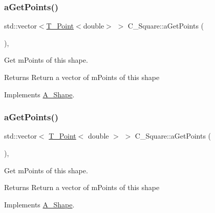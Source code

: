 \subsubsection{\texorpdfstring{a\+Get\+Points()}{aGetPoints()}\hspace{0.1cm}{\footnotesize\ttfamily [1/2]}}
{\footnotesize\ttfamily std\+::vector$<$\hyperlink{classT__Point}{T\+\_\+\+Point}$<$double$>$ $>$ C\+\_\+\+Square\+::a\+Get\+Points (\begin{DoxyParamCaption}{ }\end{DoxyParamCaption})\hspace{0.3cm}{\ttfamily [override]}, {\ttfamily [virtual]}}



Get m\+Points of this shape. 

\begin{DoxyReturn}{Returns}
Return a vector of m\+Points of this shape 
\end{DoxyReturn}


Implements \hyperlink{classA__Shape_a9fd1285bd63b1fc88943c9969bf01a5c}{A\+\_\+\+Shape}.

\mbox{\label{classC__Square_aca738fec39149ed697f3d2413cd7cec2}} 
\subsubsection{\texorpdfstring{a\+Get\+Points()}{aGetPoints()}\hspace{0.1cm}{\footnotesize\ttfamily [2/2]}}
{\footnotesize\ttfamily std\+::vector$<$ \hyperlink{classT__Point}{T\+\_\+\+Point}$<$ double $>$ $>$ C\+\_\+\+Square\+::a\+Get\+Points (\begin{DoxyParamCaption}{ }\end{DoxyParamCaption})\hspace{0.3cm}{\ttfamily [override]}, {\ttfamily [virtual]}}



Get m\+Points of this shape. 

\begin{DoxyReturn}{Returns}
Return a vector of m\+Points of this shape 
\end{DoxyReturn}


Implements \hyperlink{classA__Shape_a9fd1285bd63b1fc88943c9969bf01a5c}{A\+\_\+\+Shape}.

